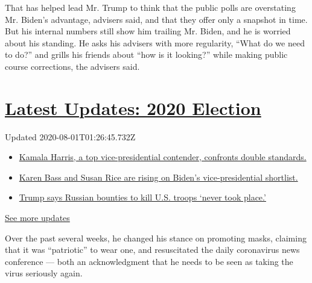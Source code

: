 That has helped lead Mr. Trump to think that the public polls are
overstating Mr. Biden's advantage, advisers said, and that they offer
only a snapshot in time. But his internal numbers still show him
trailing Mr. Biden, and he is worried about his standing. He asks his
advisers with more regularity, ``What do we need to do?'' and grills his
friends about ``how is it looking?'' while making public course
corrections, the advisers said.

\hypertarget{latest-updates-2020-election}{%
\section{\texorpdfstring{\href{https://www.nytimes.com/2020/07/31/us/elections/biden-vs-trump.html?action=click\&pgtype=Article\&state=default\&region=MAIN_CONTENT_1\&context=storylines_live_updates}{Latest
Updates: 2020
Election}}{Latest Updates: 2020 Election}}\label{latest-updates-2020-election}}

Updated 2020-08-01T01:26:45.732Z

\begin{itemize}
\tightlist
\item
  \href{https://www.nytimes.com/2020/07/31/us/elections/biden-vs-trump.html?action=click\&pgtype=Article\&state=default\&region=MAIN_CONTENT_1\&context=storylines_live_updates\#link-29fdff45}{Kamala
  Harris, a top vice-presidential contender, confronts double
  standards.}
\item
  \href{https://www.nytimes.com/2020/07/31/us/elections/biden-vs-trump.html?action=click\&pgtype=Article\&state=default\&region=MAIN_CONTENT_1\&context=storylines_live_updates\#link-13ec3d9c}{Karen
  Bass and Susan Rice are rising on Biden's vice-presidential
  shortlist.}
\item
  \href{https://www.nytimes.com/2020/07/31/us/elections/biden-vs-trump.html?action=click\&pgtype=Article\&state=default\&region=MAIN_CONTENT_1\&context=storylines_live_updates\#link-49e9a016}{Trump
  says Russian bounties to kill U.S. troops `never took place.'}
\end{itemize}

\href{https://www.nytimes.com/2020/07/31/us/elections/biden-vs-trump.html?action=click\&pgtype=Article\&state=default\&region=MAIN_CONTENT_1\&context=storylines_live_updates}{See
more updates}

Over the past several weeks, he changed his stance on promoting masks,
claiming that it was ``patriotic'' to wear one, and resuscitated the
daily coronavirus news conference --- both an acknowledgment that he
needs to be seen as taking the virus seriously again.

